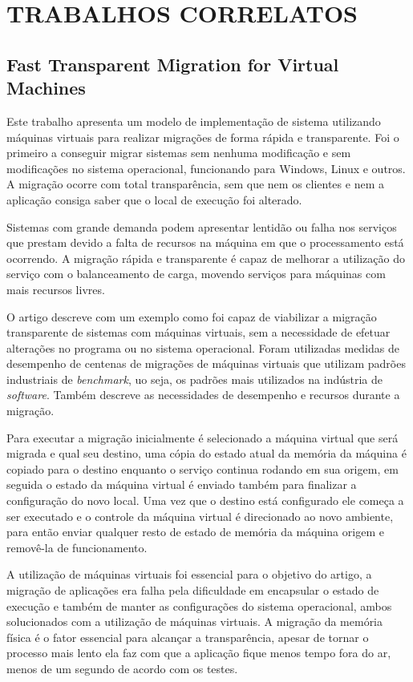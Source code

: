 \chapter{TRABALHOS CORRELATOS}

\section{Fast Transparent Migration for Virtual Machines}
	Este trabalho apresenta um modelo de implementação de sistema utilizando máquinas virtuais para realizar migrações de forma rápida e transparente. Foi o primeiro a conseguir migrar sistemas sem nenhuma modificação e sem modificações no sistema operacional, funcionando para Windows, Linux e outros. A migração ocorre com total transparência, sem que nem os clientes e nem a aplicação consiga saber que o local de execução foi alterado.
	
	Sistemas com grande demanda podem apresentar lentidão ou falha nos serviços que prestam devido a falta de recursos na máquina em que o processamento está ocorrendo. A migração rápida e transparente é capaz de melhorar a utilização do serviço com o balanceamento de carga, movendo serviços para máquinas com mais recursos livres.
	
	O artigo descreve com um exemplo como foi capaz de viabilizar a migração transparente de sistemas com máquinas virtuais, sem a necessidade de efetuar alterações no programa ou no sistema operacional. Foram utilizadas medidas de desempenho de centenas de migrações de máquinas virtuais que utilizam padrões industriais de \textit{benchmark}, uo seja, os padrões mais utilizados na indústria de \textit{software}. Também descreve as necessidades de desempenho e recursos durante a migração.
	
	Para executar a migração inicialmente é selecionado a máquina virtual que será migrada e qual seu destino, uma cópia do estado atual da memória da máquina é copiado para o destino enquanto o serviço continua rodando em sua origem, em seguida o estado da máquina virtual é enviado também para finalizar a configuração do novo local. Uma vez que o destino está configurado ele começa a ser executado e o controle da máquina virtual é direcionado ao novo ambiente, para então enviar qualquer resto de estado de memória da máquina origem e removê-la de funcionamento.
	
	A utilização de máquinas virtuais foi essencial para o objetivo do artigo, a migração de aplicações era falha pela dificuldade em encapsular o estado de execução e também de manter as configurações do sistema operacional, ambos solucionados com a utilização de máquinas virtuais. A migração da memória física é o fator essencial para alcançar a transparência, apesar de tornar o processo mais lento ela faz com que a aplicação fique menos tempo fora do ar, menos de um segundo de acordo com os testes.
	
